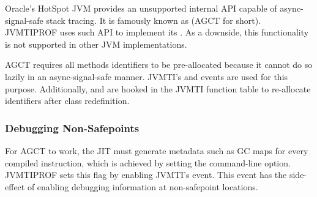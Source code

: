 Oracle's HotSpot JVM provides an unsupported internal API capable of async-signal-safe stack tracing. It is famously known as  (AGCT for short). JVMTIPROF uses such API to implement its . As a downside, this functionality is not supported in other JVM implementations.

AGCT requires all methods identifiers to be pre-allocated because it cannot do so lazily in an async-signal-safe manner. JVMTI's  and  events are used for this purpose. Additionally,  and  are hooked in the JVMTI function table to re-allocate identifiers after class redefinition.

\subsubsection*{Debugging Non-Safepoints}

For AGCT to work, the JIT must generate metadata such as GC maps for every compiled instruction, which is achieved by setting the  command-line option. JVMTIPROF sets this flag by enabling JVMTI's  event. This event has the side-effect of enabling debugging information at non-safepoint locations.

